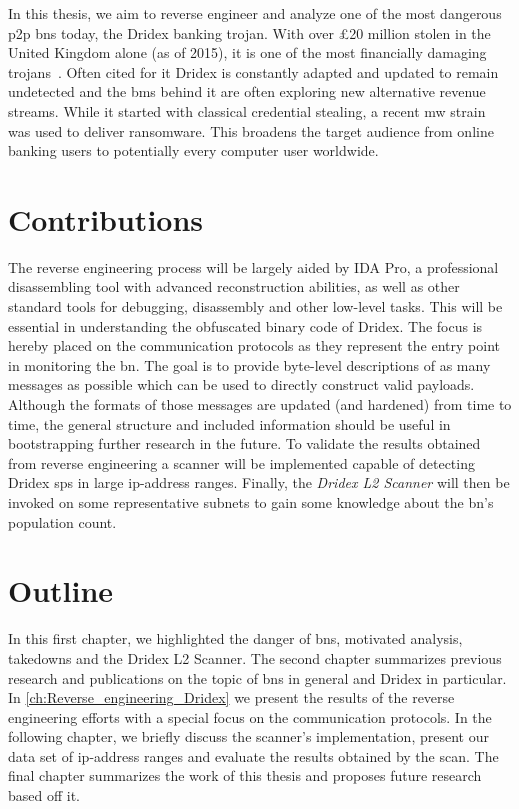 In this thesis, we aim to reverse engineer and analyze one of the most dangerous \gls{p2p} \glspl{bn} today, the Dridex banking trojan.
With over £20 million stolen in the United Kingdom alone (as of 2015), it is one of the most financially damaging trojans~\cite{nca2015uk}.
Often cited for it
Dridex is constantly adapted and updated to remain undetected and the \glspl{bm} behind it are often exploring new alternative revenue streams.
While it started with classical credential stealing, a recent \gls{mw} strain was used to deliver ransomware.
This broadens the target audience from online banking users to potentially every computer user worldwide.


\section{Contributions\label{sec:Introduction::Contributions}}
The reverse engineering process will be largely aided by IDA Pro, a professional disassembling tool with advanced reconstruction abilities, as well as other standard tools for debugging, disassembly and other low-level tasks.
This will be essential in understanding the obfuscated binary code of Dridex.
The focus is hereby placed on the communication protocols as they represent the entry point in monitoring the \gls{bn}.
The goal is to provide byte-level descriptions of as many messages as possible which can be used to directly construct valid payloads.
Although the formats of those messages are updated (and hardened) from time to time, the general structure and included information should be useful in bootstrapping further research in the future.
To validate the results obtained from reverse engineering a scanner will be implemented capable of detecting Dridex \glspl{sp} in large \gls{ip}-address ranges.
Finally, the \emph{Dridex L2 Scanner} will then be invoked on some representative subnets to gain some knowledge about the \gls{bn}'s population count.


\section{Outline\label{sec:Introduction::Outline}}
In this first chapter, we highlighted the danger of \glspl{bn}, motivated analysis, takedowns and the Dridex L2 Scanner.
The second chapter summarizes previous research and publications on the topic of \glspl{bn} in general and Dridex in particular.
In \autoref{ch:Reverse_engineering_Dridex} we present the results of the reverse engineering efforts with a special focus on the communication protocols.
In the following chapter, we briefly discuss the scanner's implementation, present our data set of \gls{ip}-address ranges and evaluate the results obtained by the scan.
The final chapter summarizes the work of this thesis and proposes future research based off it.